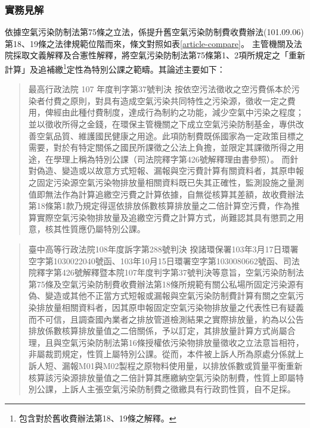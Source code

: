 \documentclass[11pt,a4paper]{article}
\begin{document}
\subsubsection{實務見解}
依據空氣污染防制法第75條之立法，係提升舊空氣污染防制費收費辦法(101.09.06)第18、19條之法律規範位階而來，條文對照如表\ref{article-compare}。
主管機關及法院採取文義解釋及合憲性解釋，將空氣污染防制法第75條第1、2項所規定之「重新計算」及追補繳\footnote{包含對於舊收費辦法第18、19條之解釋。}定性為特別公課之範疇。其論述主要如下：

\begin{quote}{最高行政法院 107 年度判字第37號判決}
   按依空污法徵收之空污費係本於污染者付費之原則，對具有造成空氣污染共同特性之污染源，徵收一定之費用，俾經由此種付費制度，達成行為制約之功能，減少空氣中污染之程度；並以徵收所得之金錢，在環保主管機關之下成立空氣污染防制基金，專供改善空氣品質、維護國民健康之用途。此項防制費既係國家為一定政策目標之需要，對於有特定關係之國民所課徵之公法上負擔，並限定其課徵所得之用途，在學理上稱為特別公課（司法院釋字第426號解釋理由書參照）。
   而針對偽造、變造或以故意方式短報、漏報與空污費計算有關資料者，其原申報之固定污染源空氣污染物排放量相關資料既已失其正確性，監測設施之量測值即無法作為計算追繳空污費之計算依據，自無從核算其差額，故收費辦法第18條第1款乃規定得逕依排放係數核算排放量之二倍計算空污費，作為推算實際空氣污染物排放量及追繳空污費之計算方式，尚難認其具有懲罰之用意，核其性質應仍屬特別公課。
\end{quote}

\begin{quote}{臺中高等行政法院108年度訴字第288號判決}
   揆諸環保署103年3月17日環署空字第1030022040號函、103年10月15日環署空字第1030080662號函、司法院釋字第426號解釋暨本院107年度判字第37號判決等意旨，空氣污染防制法第75條及空氣污染防制費收費辦法第18條所規範有關公私場所固定污染源有偽、變造或其他不正當方式短報或漏報與空氣污染防制費計算有關之空氣污染排放量相關資料者，因其原申報固定空氣污染物排放量之代表性已有疑義而不可信，且調查國內業者之排放管道檢測結果之實際排放量，約為以公告排放係數核算排放量值之二倍關係，予以訂定，其排放量計算方式尚屬合理，且與空氣污染防制法第16條授權依污染物排放量徵收之立法意旨相符，非屬裁罰規定，性質上屬特別公課。從而，本件被上訴人所為原處分係就上訴人短、漏報M01與M02製程之原物料使用量，以排放係數或質量平衡重新核算該污染源排放量值之二倍計算其應繳納空氣污染防制費，性質上即屬特別公課，上訴人主張空氣污染防制費之徵繳具有行政罰性質，自不足採。
\end{quote}


\end{document}
